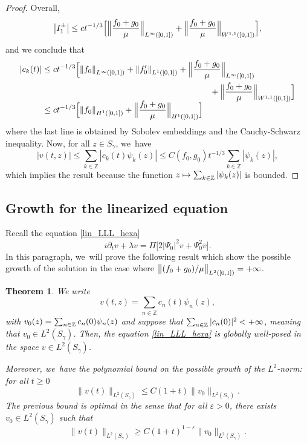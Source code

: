\documentclass[JEP,XML,SOM,Unicode,NoFloatCountersInSection,published]{cedram}
\newcommand\mto{\mathchoice{\longmapsto}{\mapsto}{\mapsto}{\mapsto}}
\newtheorem{theorem}{Theorem}[section]
\theoremstyle{definition}
\let\eps\varepsilon
\let\dis\relax
\let\ov\overline
\newcommand\Z{\mathbb Z}
\newcommand{\Bpac}[1]{\Bigl[#1\Bigr]}
\newcommand{\abs}[1]{\left|#1\right|}
\newcommand{\absabs}[1]{\left\|#1\right\|}
\newcommand{\Babsabs}[1]{\Bigl\|#1\Bigr\|}
\begin{document}
\begin{proof}
Overall,
\begin{equation}\label{Int4}
\abs{I_1^\pm} \leq {c}{t^{-1/3}} \Bpac{\Babsabs{\frac{{f}_0+{g}_0}{\mu} }_{L^\infty([0,1])} + \Babsabs{\frac{{f}_0+{g}_0}{\mu} }_{W^{1,1}([0,1])}},
\end{equation}
and we conclude that
\begin{align*}
|c_k(t)| &\leq {c}{t^{-1/3}} \Bpac{\absabs{{f}_0 }_{L^\infty([0,1])} + \absabs{{f}_0'}_{L^1([0,1])}+\Babsabs{\frac{{f}_0+{g}_0}{\mu} }_{L^\infty([0,1])}\\
&\hspace*{7cm}+ \Babsabs{\frac{{f}_0+{g}_0}{\mu} }_{W^{1,1}([0,1])}} \\[-5pt]
&\leq {c}{t^{-1/3}} \Bpac{\absabs{{f}_0}_{H^1([0,1])}+ \Babsabs{\frac{{f}_0+{g}_0}{\mu} }_{H^1([0,1])}}
\end{align*}
where the last line is obtained by Sobolev embeddings and the Cauchy-Schwarz inequality. Now, for all $z \in S_{\gamma}$, we~have
\begin{equation*}
|v(t,z)| \leq \sum_{k\in\Z}|c_k(t)\psi_k(z)| \leq {C({f}_0,{g}_0)}{t^{-1/3}}\sum_{k\in\Z}|\psi_k(z)|,
\end{equation*}
which implies the result because the function $\dis z \mto \sum_{k\in\Z}|\psi_k(z)|$ is bounded.
\end{proof}

\subsection{Growth for the linearized equation}

Recall the equation \eqref{lin_LLL_hexa}
\begin{equation*}
i\partial_t v + \lambda v = \Pi\big[2|\Psi_0|^2v+\Psi_0^2\ov{v}\big].
\end{equation*}
In this paragraph, we~will prove the following result which show the possible growth of the solution in the case where $ \dis \big\| ({{f}_0+{g}_0})/{\mu} \big\|_{L^2([0, 1])}=+\infty$.

\begin{theorem}\label{thm_borne}
We write
\[
v(t,z) = \sum_{n\in\Z} c_n(t) \psi_n(z), 
\]
with $\dis v_0(z) = \sum_{n\in\Z} c_n(0) \psi_n(z)$ and suppose that $ \dis \sum_{n \in \Z} |c_n(0)|^2 < +\infty$, meaning that $v_0 \in L^2(S_{\gamma})$. Then, the equation \eqref{lin_LLL_hexa} is globally well-posed in the space $v \in L^2(S_{\gamma})$. 

Moreover, we~have the polynomial bound on the possible growth of the $L^2$-norm: for all $t\geq 0$
\begin{equation}\label{bound00}
\|v(t)\|_{L^2(S_\gamma)} \leq C(1+t) \|v_0\|_{L^2(S_\gamma)}.
\end{equation}
The previous bound is optimal in the sense that for all $\eps>0$, there exists $v_0 \in L^2(S_{\gamma})$ such that
\begin{equation*}
\|v(t)\|_{L^2(S_\gamma)} \geq C(1+t)^{1-\eps} \|v_0\|_{L^2(S_\gamma)}.
\end{equation*}
\end{theorem}
\end{document}
